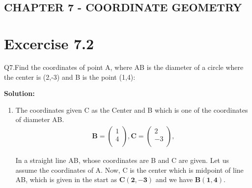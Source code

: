 \documentclass[12pt]{article}
\newcommand{\solution}{\noindent \textbf{Solution: }}
\newcommand{\myvec}[1]{\ensuremath{\begin{pmatrix}#1\end{pmatrix}}}
\let\vec\mathbf
\begin{document}
\begin{center}
\section*{CHAPTER 7 - COORDINATE GEOMETRY}

\end{center}
\section*{Excercise 7.2}

Q7.Find the coordinates of point A, where AB is the diameter of a circle where the center is (2,-3) and B is the point (1,4):

\solution
\begin{enumerate}
\item The coordinates given C as the Center and B which is one of the coordinates of diameter AB.
	\begin{align}
	\vec{B} = \myvec{
		1\\
	    4\\
		},
	\vec{C} = \myvec{
	    2\\
	   -3\\
		},
	\end{align}
	
In a straight line AB, whose coordinates are B and C are given.
Let us assume the coordinates of A. Now, C is the center which is midpoint of line AB, which is given in the start as $\vec{C(2, -3)}$ and we have $\vec{B(1,4)}$.
		

\end{enumerate}
\end{document}
